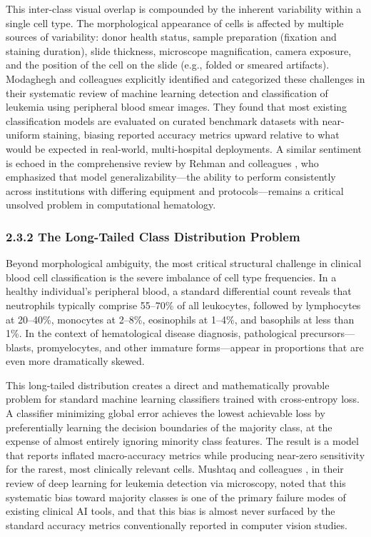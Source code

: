\documentclass[11pt]{article}
\begin{document}
This inter-class visual overlap is compounded by the inherent variability within a single cell type. The morphological appearance of cells is affected by multiple sources of variability: donor health status, sample preparation (fixation and staining duration), slide thickness, microscope magnification, camera exposure, and the position of the cell on the slide (e.g., folded or smeared artifacts). Modaghegh and colleagues \cite{modaghegh2021} explicitly identified and categorized these challenges in their systematic review of machine learning detection and classification of leukemia using peripheral blood smear images. They found that most existing classification models are evaluated on curated benchmark datasets with near-uniform staining, biasing reported accuracy metrics upward relative to what would be expected in real-world, multi-hospital deployments. A similar sentiment is echoed in the comprehensive review by Rehman and colleagues \cite{rehman2021}, who emphasized that model generalizability—the ability to perform consistently across institutions with differing equipment and protocols—remains a critical unsolved problem in computational hematology.

\subsubsection*{2.3.2 The Long-Tailed Class Distribution Problem}

Beyond morphological ambiguity, the most critical structural challenge in clinical blood cell classification is the severe imbalance of cell type frequencies. In a healthy individual's peripheral blood, a standard differential count reveals that neutrophils typically comprise 55--70\% of all leukocytes, followed by lymphocytes at 20--40\%, monocytes at 2--8\%, eosinophils at 1--4\%, and basophils at less than 1\%. In the context of hematological disease diagnosis, pathological precursors—blasts, promyelocytes, and other immature forms—appear in proportions that are even more dramatically skewed.

This long-tailed distribution creates a direct and mathematically provable problem for standard machine learning classifiers trained with cross-entropy loss. A classifier minimizing global error achieves the lowest achievable loss by preferentially learning the decision boundaries of the majority class, at the expense of almost entirely ignoring minority class features. The result is a model that reports inflated macro-accuracy metrics while producing near-zero sensitivity for the rarest, most clinically relevant cells. Mushtaq and colleagues \cite{mushtaq2022}, in their review of deep learning for leukemia detection via microscopy, noted that this systematic bias toward majority classes is one of the primary failure modes of existing clinical AI tools, and that this bias is almost never surfaced by the standard accuracy metrics conventionally reported in computer vision studies.
\end{document}
